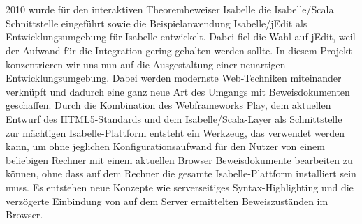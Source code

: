 \section*{\abstractname}

2010 wurde für den interaktiven Theorembeweiser Isabelle die Isabelle/Scala Schnittstelle eingeführt
sowie die Beispielanwendung Isabelle/jEdit als Entwicklungsumgebung für Isabelle entwickelt. Dabei
fiel die Wahl auf jEdit, weil der Aufwand für die Integration gering gehalten werden sollte. In
diesem Projekt konzentrieren wir uns nun auf die Ausgestaltung einer neuartigen
Entwicklungsumgebung. Dabei werden modernste Web-Techniken miteinander verknüpft und dadurch eine
ganz neue Art des Umgangs mit Beweisdokumenten geschaffen. Durch die Kombination des Webframeworks
Play, dem aktuellen Entwurf des HTML5-Standards und dem Isabelle/Scala-Layer als Schnittstelle zur
mächtigen Isabelle-Plattform entsteht ein Werkzeug, das verwendet werden kann, um ohne jeglichen
Konfigurationsaufwand für den Nutzer von einem beliebigen Rechner mit einem aktuellen Browser
Beweisdokumente bearbeiten zu können, ohne dass auf dem Rechner die gesamte Isabelle-Plattform
installiert sein muss. Es entstehen neue Konzepte wie serverseitiges Syntax-Highlighting und die
verzögerte Einbindung von auf dem Server ermittelten Beweiszuständen im Browser.